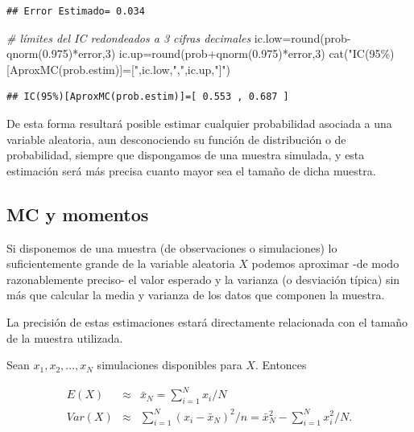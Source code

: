 \documentclass[
]{book}
\newenvironment{Shaded}{\begin{snugshade}}{\end{snugshade}}
\newcommand{\CommentTok}[1]{\textcolor[rgb]{0.56,0.35,0.01}{\textit{#1}}}
\newcommand{\DecValTok}[1]{\textcolor[rgb]{0.00,0.00,0.81}{#1}}
\newcommand{\FloatTok}[1]{\textcolor[rgb]{0.00,0.00,0.81}{#1}}
\newcommand{\FunctionTok}[1]{\textcolor[rgb]{0.00,0.00,0.00}{#1}}
\newcommand{\NormalTok}[1]{#1}
\newcommand{\OtherTok}[1]{\textcolor[rgb]{0.56,0.35,0.01}{#1}}
\newcommand{\SpecialCharTok}[1]{\textcolor[rgb]{0.00,0.00,0.00}{#1}}
\newcommand{\StringTok}[1]{\textcolor[rgb]{0.31,0.60,0.02}{#1}}
\theoremstyle{definition}
\theoremstyle{definition}
\theoremstyle{definition}
\theoremstyle{definition}
\theoremstyle{remark}
\begin{document}
\begin{verbatim}
## Error Estimado= 0.034
\end{verbatim}

\begin{Shaded}
\begin{Highlighting}[]
\CommentTok{\# límites del IC redondeados a 3 cifras decimales}
\NormalTok{ic.low}\OtherTok{=}\FunctionTok{round}\NormalTok{(prob}\SpecialCharTok{{-}}\FunctionTok{qnorm}\NormalTok{(}\FloatTok{0.975}\NormalTok{)}\SpecialCharTok{*}\NormalTok{error,}\DecValTok{3}\NormalTok{)}
\NormalTok{ic.up}\OtherTok{=}\FunctionTok{round}\NormalTok{(prob}\SpecialCharTok{+}\FunctionTok{qnorm}\NormalTok{(}\FloatTok{0.975}\NormalTok{)}\SpecialCharTok{*}\NormalTok{error,}\DecValTok{3}\NormalTok{)}
\FunctionTok{cat}\NormalTok{(}\StringTok{"IC(95\%)[AproxMC(prob.estim)]=["}\NormalTok{,ic.low,}\StringTok{","}\NormalTok{,ic.up,}\StringTok{"]"}\NormalTok{)}
\end{Highlighting}
\end{Shaded}

\begin{verbatim}
## IC(95%)[AproxMC(prob.estim)]=[ 0.553 , 0.687 ]
\end{verbatim}

De esta forma resultará posible estimar cualquier probabilidad asociada a una variable aleatoria, aun desconociendo su función de distribución o de probabilidad, siempre que dispongamos de una muestra simulada, y esta estimación será más precisa cuanto mayor sea el tamaño de dicha muestra.

\hypertarget{mc-y-momentos}{%
\subsection{MC y momentos}\label{mc-y-momentos}}

Si disponemos de una muestra (de observaciones o simulaciones) lo suficientemente grande de la variable aleatoria \(X\) podemos aproximar -de modo razonablemente preciso- el valor esperado y la varianza (o desviación típica) sin más que calcular la media y varianza de los datos que componen la muestra.

La precisión de estas estimaciones estará directamente relacionada con el tamaño de la muestra utilizada.

Sean \(x_1, x_2,...,x_N\) simulaciones disponibles para \(X\). Entonces

\begin{eqnarray*}
E(X) &\approx& \bar{x}_N=\sum_{i=1}^N x_i /N \\
Var(X) &\approx& \sum_{i=1}^N (x_i-\bar{x}_N)^2/n = \bar{x}_N^2-\sum_{i=1}^N x_i^2 /N.
\end{eqnarray*}
\end{document}
